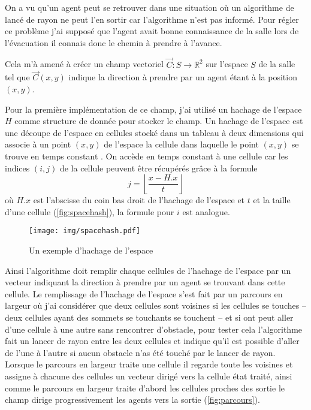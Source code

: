 \documentclass{article}
\newcommand{\R}{\mathbb{R}}
\begin{document}
On a vu qu'un agent peut se retrouver dans une situation où un
algorithme de lancé de rayon ne peut l'en sortir car l'algorithme
n'est pas informé. Pour régler ce problème j'ai supposé que
l'agent avait bonne connaissance de la salle lors de l'évacuation
il connais donc le chemin à prendre à l'avance.

Cela m'à amené à créer un champ vectoriel $\vec{C}: S \to \R^2$ sur
l'espace $S$ de la salle tel que $\vec{C}(x, y)$ indique la direction
à prendre par un agent étant à la position $(x, y)$.

Pour la première implémentation de ce champ, j'ai utilisé un
hachage de l'espace $H$ comme structure de donnée pour stocker le champ.
Un hachage de l'espace est une découpe de l'espace en cellules stocké
dans un tableau à deux dimensions qui
associe à un point $(x, y)$ de l'espace la cellule dans laquelle
le point $(x, y)$ se trouve en temps constant \cite{MacDonald09}.
On accède en temps
constant à une cellule car les indices $(i, j)$ de la cellule peuvent
être récupérés grâce à la formule
\[
  j = \left\lfloor \frac{x - H.x}{t} \right\rfloor
\]
où $H.x$ est l'abscisse du coin bas droit de l'hachage de l'espace et $t$
et la taille d'une cellule (\autoref{fig:spacehash}), la formule pour $i$
est analogue.

\begin{figure}[h]
  \centering
  \texttt{[image: img/spacehash.pdf]}
  \caption{Un exemple d'hachage de l'espace}
  \label{fig:spacehash}
\end{figure}

Ainsi l'algorithme doit remplir chaque cellules de l'hachage de l'espace
par un vecteur indiquant la direction à prendre par un agent se trouvant
dans cette cellule. Le remplissage de l'hachage de l'espace s'est fait
par un parcours en largeur où
j'ai considérer que deux cellules sont voisines si les cellules
se touches -- deux cellules ayant des sommets se touchants se
touchent --  et si ont peut aller d'une cellule à une autre
sans rencontrer d'obstacle, pour tester cela l'algorithme fait
un lancer de rayon entre les deux cellules et indique qu'il
est possible d'aller de l'une à l'autre si aucun obstacle n'as
été touché par le lancer de rayon. Lorsque le parcours en largeur
traite une cellule il regarde toute les voisines et assigne
à chacune des cellules un vecteur dirigé vers la cellule état traité,
ainsi comme le parcours en largeur traite d'abord les cellules
proches des sortie le champ dirige progressivement les agents
vers la sortie (\autoref{fig:parcours}).
\end{document}
